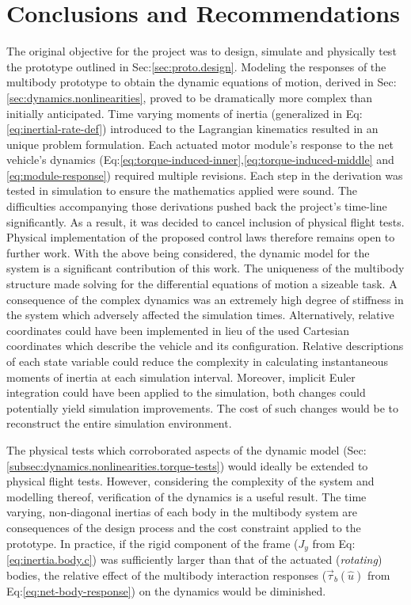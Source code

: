 \chapter{Conclusions and Recommendations}
\label{ch:conclusion}
The original objective for the project was to design, simulate and physically test the prototype outlined in Sec:\ref{sec:proto.design}. Modeling the responses of the multibody prototype to obtain the dynamic equations of motion, derived in Sec:\ref{sec:dynamics.nonlinearities}, proved to be dramatically more complex than initially anticipated. 
Time varying moments of inertia (generalized in Eq:\ref{eq:inertial-rate-def}) introduced to the Lagrangian kinematics resulted in an unique problem formulation. Each actuated motor module's response to the net vehicle's dynamics (Eq:\ref{eq:torque-induced-inner},\ref{eq:torque-induced-middle} and \ref{eq:module-response}) required multiple revisions. Each step in the derivation was tested in simulation to ensure the mathematics applied were sound. The difficulties accompanying those derivations pushed back the project's time-line significantly. As a result, it was decided to cancel inclusion of physical flight tests. Physical implementation of the proposed control laws therefore remains open to further work.  With the above being considered, the dynamic model for the system is a significant contribution of this work. The uniqueness of the multibody structure made solving for the differential equations of motion a sizeable task. A consequence of the complex dynamics was an extremely high degree of stiffness in the system which adversely affected the simulation times. Alternatively, relative coordinates could have been implemented in lieu of the used Cartesian coordinates which describe the vehicle and its configuration. Relative descriptions of each state variable could reduce the complexity in calculating instantaneous moments of inertia at each simulation interval. Moreover, implicit Euler integration could have been applied to the simulation, both changes could potentially yield simulation improvements. The cost of such changes would be to reconstruct the entire simulation environment.
\par
The physical tests which corroborated aspects of the dynamic model (Sec:\ref{subsec:dynamics.nonlinearities.torque-tests}) would ideally be extended to physical flight tests. However, considering the complexity of the system and modelling thereof, verification of the dynamics is a useful result. The time varying, non-diagonal inertias of each body  in the multibody system are consequences of the design process and the cost constraint applied to the prototype. In practice, if the rigid component of the frame ($J_y$ from Eq:\ref{eq:inertia.body.c}) was sufficiently larger than that of the actuated (\emph{rotating}) bodies, the relative effect of the multibody interaction responses ($\vec{\tau}_b(\hat{u})$ from Eq:\ref{eq:net-body-response}) on the dynamics would be diminished.
